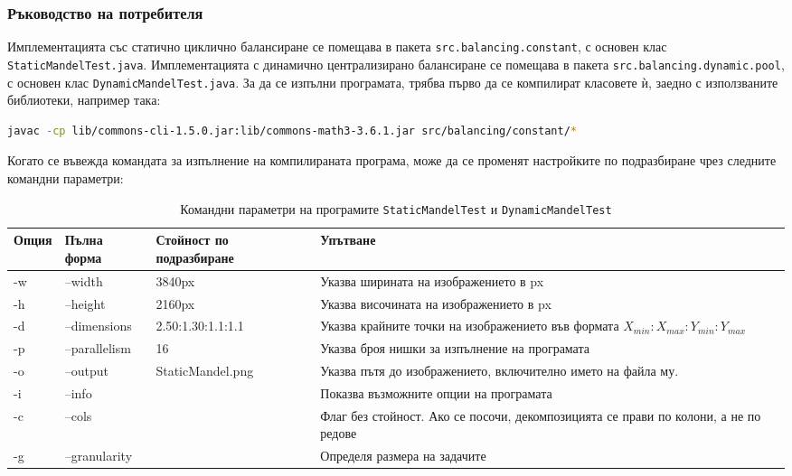 \documentclass[a4paper,11pt]{article}
\begin{document}
\subsubsection{Ръководство на потребителя}
Имплементацията със статично циклично балансиране се помещава в пакета \lstinline{src.balancing.constant}, с основен клас \lstinline{StaticMandelTest.java}. 
Имплементацията с динамично централизирано балансиране се помещава в пакета \lstinline{src.balancing.dynamic.pool}, с основен клас \lstinline{DynamicMandelTest.java}. 
За да се изпълни програмата, трябва първо да се компилират класовете ѝ, заедно с използваните библиотеки, например така:
\begin{lstlisting}[language=bash,caption={Компилиране на StaticMandelTest от директорията корен на проекта},breaklines=true]
javac -cp lib/commons-cli-1.5.0.jar:lib/commons-math3-3.6.1.jar src/balancing/constant/*
\end{lstlisting}
Когато се въвежда командата за изпълнение на компилираната програма, може да се променят настройките по подразбиране чрез следните командни параметри:
\begin{table}[H]
\centering
\begin{tabular}{|l|l|l|p{6cm}|}
\hline
\textbf{Опция} & \textbf{Пълна форма} & \textbf{Стойност по подразбиране} & \textbf{Упътване} \\
\hline
-w & --width & 3840px & Указва ширината на изображението в px \\
\hline
-h & --height & 2160px & Указва височината на изображението в px \\
\hline
-d & --dimensions & 2.50:1.30:1.1:1.1 & Указва крайните точки на изображението във формата $X_{min}:X_{max}:Y_{min}:Y_{max}$ \\
\hline
-p & --parallelism & 16 & Указва броя нишки за изпълнение на програмата \\
\hline
-o & --output & StaticMandel.png & Указва пътя до изображението, включително името на файла му. \\
\hline
-i & --info & & Показва възможните опции на програмата \\
\hline
-c & --cols &  & Флаг без стойност. Ако се посочи, декомпозицията се прави по колони, а не по редове \\
\hline
-g & --granularity &  & Определя размера на задачите\\
\hline
\end{tabular}
\caption{Командни параметри на програмите \lstinline{StaticMandelTest} и \lstinline{DynamicMandelTest}}
\end{table}
\end{document}
